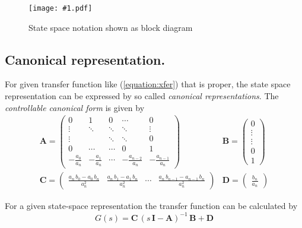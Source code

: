 \documentclass[a4paper,12pt]{article}
\newcommand{\Fig}[3]{%
	\begin{figure}[htb]%
	\begin{center}%
	\texttt{[image: \#1.pdf]}%
	\end{center}%
	\caption{#3\label{fig:#1}}%
	\end{figure}%
	}
\newcommand{\Mat}[1]{\mathbf{#1}}
\newcommand{\SubSection}[2]{\subsection{#2}\label{subsection:#1}}
\newcommand{\ERef}[1]{(\ref{equation:#1})}
\begin{document}
\Fig{statespace}{0.8}{State space notation shown as block diagram}

\SubSection{canonical}{Canonical representation.}

For given transfer function like \ERef{xfer} that is proper, the state space
representation can be expressed by so called {\em canonical representations}.
The {\em controllable canonical form} is given by
\begin{equation}
\begin{array}{ll}
\Mat{A}=\left(\begin{array}{ccccc}
0 & 1 & 0 & \cdots & 0\\
\vdots & \ddots & \ddots & \ddots & \vdots\\
\vdots & & \ddots & \ddots & 0\\
0 & \cdots & \cdots & 0 & 1\\
-\frac{a_0}{a_n} & -\frac{a_1}{a_n} & \cdots & -\frac{a_{n-2}}{a_n} & -\frac{a_{n-1}}{a_n}
\end{array}\right)
&
\Mat{B}=\left(\begin{array}{c}
0\\
\vdots\\
\vdots\\
0\\
1
\end{array}\right)\\
\Mat{C}=\left(\begin{array}{ccccc}
\frac{a_n\,b_0-a_0\,b_n}{a_n^2} & \frac{a_n\,b_1-a_1\,b_n}{a_n^2} & \cdots & \frac{a_n\,b_{n-1}-a_{n-1}\,b_n}{a_n^2}
\end{array}\right)
&
\Mat{D}=\left(\begin{array}{c}
\frac{b_n}{a_n}
\end{array}\right)
\end{array}
\end{equation}

For a given state-space representation the transfer function can be calculated
by
\begin{equation}
G(s)=\Mat{C}\,\left(s\,\Mat{I}-\Mat{A}\right)^{-1}\,\Mat{B}+\Mat{D}
\end{equation}
\end{document}
